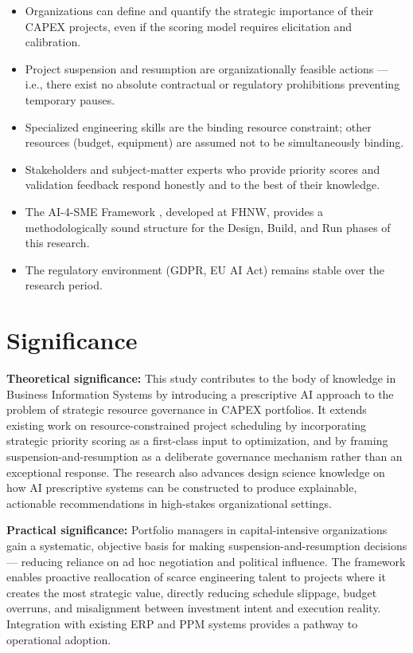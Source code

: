 \begin{itemize}
  \item Organizations can define and quantify the strategic importance of their CAPEX projects,
        even if the scoring model requires elicitation and calibration.
  \item Project suspension and resumption are organizationally feasible actions — i.e., there
        exist no absolute contractual or regulatory prohibitions preventing temporary pauses.
  \item Specialized engineering skills are the binding resource constraint; other resources
        (budget, equipment) are assumed not to be simultaneously binding.
  \item Stakeholders and subject-matter experts who provide priority scores and validation
        feedback respond honestly and to the best of their knowledge.
  \item The AI-4-SME Framework \parencite{peter2025ai4sme}, developed at FHNW, provides a
        methodologically sound structure for the Design, Build, and Run phases of this research.
  \item The regulatory environment (GDPR, EU AI Act) remains stable over the research period.
\end{itemize}

\section{Significance}
\label{sec:significance}

\textbf{Theoretical significance:}
This study contributes to the body of knowledge in Business Information Systems by introducing a
prescriptive AI approach to the problem of strategic resource governance in CAPEX portfolios. It
extends existing work on resource-constrained project scheduling by incorporating strategic
priority scoring as a first-class input to optimization, and by framing suspension-and-resumption
as a deliberate governance mechanism rather than an exceptional response. The research also
advances design science knowledge on how AI prescriptive systems can be constructed to produce
explainable, actionable recommendations in high-stakes organizational settings.

\textbf{Practical significance:}
Portfolio managers in capital-intensive organizations gain a systematic, objective basis for
making suspension-and-resumption decisions — reducing reliance on ad hoc negotiation and
political influence. The framework enables proactive reallocation of scarce engineering talent
to projects where it creates the most strategic value, directly reducing schedule slippage,
budget overruns, and misalignment between investment intent and execution reality. Integration
with existing ERP and PPM systems provides a pathway to operational adoption.

